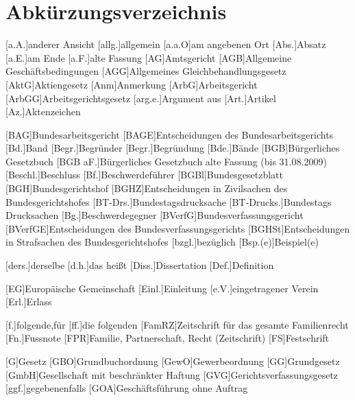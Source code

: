 \chapter{Abkürzungsverzeichnis}
\begin{acronym}[MittRhNotK]
\setlength{\itemsep}{-\parsep} %
[a.A.]{anderer Ansicht}
[allg.]{allgemein}
[a.a.O]{am angebenen Ort}
[Abs.]{Absatz}
[a.E.]{am Ende}
[a.F.]{alte Fassung}
[AG]{Amtsgericht}
[AGB]{Allgemeine Geschäftsbedingungen}
[AGG]{Allgemeines Gleichbehandlungsgesetz}
[AktG]{Aktiengesetz}
[Anm]{Anmerkung}
[ArbG]{Arbeitsgericht}
[ArbGG]{Arbeitsgerichtsgesetz}
[arg.e.]{Argument aus}
[Art.]{Artikel}
[Az.]{Aktenzeichen}

[BAG]{Bundesarbeitsgericht}
[BAGE]{Entscheidungen des Bundesarbeitsgerichts}
[Bd.]{Band}
[Begr.]{Begründer}
[Begr.]{Begründung}
[Bde.]{Bände}
[BGB]{Bürgerliches Gesetzbuch}
[BGB aF.]{Bürgerliches Gesetzbuch alte Fassung (bis 31.08.2009)}
[Beschl.]{Beschluss}
[Bf.]{Beschwerdeführer}
[BGBl]{Bundesgesetzblatt}
[BGH]{Bundesgerichtshof}
[BGHZ]{Entscheidungen in Zivilsachen des Bundesgerichtshofes}
[BT-Drs.]{Bundestagsdrucksache}
[BT-Drucks.]{Bundestags Drucksachen}
[Bg.]{Beschwerdegegner}
[BVerfG]{Bundesverfassungsgericht}
[BVerfGE]{Entscheidungen des Bundesverfassungsgerichts}
[BGHSt]{Entscheidungen in Strafsachen des Bundesgerichtshofes}
[bzgl.]{bezüglich}
[Bsp.(e)]{Beispiel(e)}

[ders.]{derselbe}
[d.h.]{das heißt}
[Diss.]{Dissertation}
[Def.]{Definition}

[EG]{Europäische Gemeinschaft}
[Einl.]{Einleitung}
[e.V.]{eingetragener Verein}
[Erl.]{Erlass}

[f.]{folgende,für}
[ff.]{die folgenden}
[FamRZ]{Zeitschrift für das gesamte Familienrecht}
[Fn.]{Fussnote}
[FPR]{Familie, Partnerschaft, Recht (Zeitschrift)}
[FS]{Festschrift}

[G]{Gesetz}
[GBO]{Grundbuchordnung}
[GewO]{Gewerbeordnung}
[GG]{Grundgesetz}
[GmbH]{Gesellschaft mit beschränkter Haftung}
[GVG]{Gerichtsverfassungsgesetz}
[ggf.]{gegebenenfalls}
[GOA]{Geschäftsführung ohne Auftrag}


\end{acronym}
